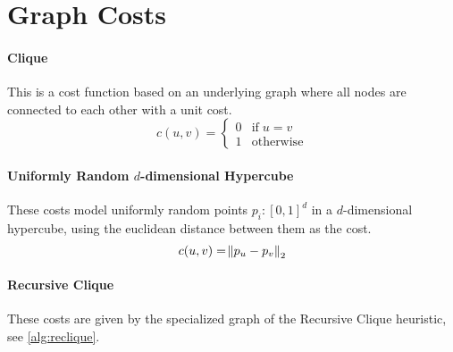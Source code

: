 \documentclass[a4paper, oneside]{discothesis}
\begin{document}
\section{Graph Costs}
\label{graph-costs}

\paragraph{Clique}\label{costs:clique} This is a cost function based on an underlying graph where all nodes are connected to each other with a unit cost.
\begin{equation}
c(u,v)=
\begin{cases}
0 & \text{if}\;u=v \\
1 & \text{otherwise}
\end{cases}
\end{equation}


\paragraph{Uniformly Random $d$-dimensional Hypercube}\label{costs:cube} These costs model uniformly random points $p_i:[0,1]^d$ in a $d$-dimensional hypercube, using the euclidean distance between them as the cost.
\begin{equation}
c(u,v)=\norm{p_u-p_v}_2
\end{equation}

\paragraph{Recursive Clique} These costs are given by the specialized graph of the Recursive Clique heuristic, see \autoref{alg:reclique}.
\end{document}
